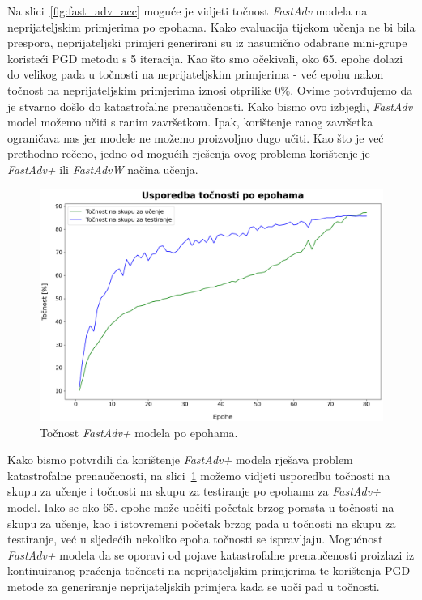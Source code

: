 \documentclass[times, utf8, zavrsni, numeric]{fer}
\begin{document}
\pagebreak

Na slici~\ref{fig:fast_adv_acc} moguće je vidjeti točnost \textit{FastAdv} modela na neprijateljskim primjerima po epohama.
Kako evaluacija tijekom učenja ne bi bila prespora, neprijateljski primjeri generirani su iz nasumično odabrane mini-grupe koristeći PGD metodu s 5 iteracija.
Kao što smo očekivali, oko 65. epohe dolazi do velikog pada u točnosti na neprijateljskim primjerima - već epohu nakon točnost na neprijateljskim primjerima iznosi otprilike $0\%$.
Ovime potvrđujemo da je stvarno došlo do katastrofalne prenaučenosti. Kako bismo ovo izbjegli, \textit{FastAdv} model možemo učiti s ranim završetkom. 
Ipak, korištenje ranog završetka ograničava nas jer modele ne možemo proizvoljno dugo učiti. 
Kao što je već prethodno rečeno, jedno od mogućih rješenja ovog problema korištenje je \textit{FastAdv+} ili \textit{FastAdvW} načina učenja.

\begin{figure}[htb]
    \centering
    \includegraphics[scale=0.41]{../stats/resnet18_fast+_epochs_80_lr_0.2_early/accuracies.png}
    \caption{Točnost \textit{FastAdv+} modela po epohama.}
    \label{fig:fast_plus_acc}
\end{figure}

Kako bismo potvrdili da korištenje \textit{FastAdv+} modela rješava problem katastrofalne prenaučenosti, 
na slici~\ref{fig:fast_plus_acc} možemo vidjeti usporedbu točnosti na skupu za učenje i točnosti na skupu za testiranje po epohama za \textit{FastAdv+} model.
Iako se oko 65. epohe može uočiti početak brzog porasta u točnosti na skupu za učenje, kao i istovremeni početak brzog pada u točnosti na skupu za testiranje,
već u sljedećih nekoliko epoha točnosti se ispravljaju. 
Mogućnost \textit{FastAdv+} modela da se oporavi od pojave katastrofalne prenaučenosti proizlazi iz kontinuiranog praćenja točnosti na neprijateljskim primjerima 
te korištenja PGD metode za generiranje neprijateljskih primjera kada se uoči pad u točnosti.
\end{document}

